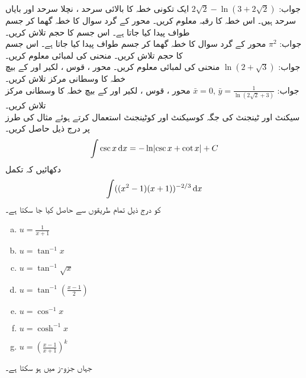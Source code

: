جواب:\quad
$2\sqrt{2}-\ln(3+2\sqrt{2})$
ایک تکونی خطہ کا بالائی سرحد ، نچلا سرحد  اور بایاں سرحد  ہیں۔ اس خطہ کا رقبہ معلوم کریں۔
محور  کے گرد سوال  کا خطہ گھما کر جسم طواف پیدا کیا جاتا ہے۔ اس جسم کا حجم تلاش کریں۔\\
جواب:\quad
$\pi^2$
محور  کے گرد سوال  کا خطہ گھما کر جسم طواف پیدا کیا جاتا ہے۔ اس جسم کا حجم تلاش کریں۔
منحنی  کی لمبائی معلوم کریں۔\\
جواب:\quad
$\ln(2+\sqrt{3})$
منحنی  کی لمبائی معلوم کریں۔
محور ، قوس ، لکیر  اور  کے بیچ خطہ کا وسطانی مرکز تلاش کریں۔\\
جواب:\quad
$\bar{x}=0,\,\bar{y}=\tfrac{1}{\ln(2\sqrt{2}+3)}$
محور ، قوس ، لکیر  اور  کے بیچ خطہ کا وسطانی مرکز تلاش کریں۔
\\
سیکنٹ اور ٹینجنٹ کی جگہ کوسیکنٹ اور کوٹینجنٹ استعمال کرتے ہوئے مثال  کی طرز پر درج ذیل حاصل کریں۔
\begin{align*}
\int\csc x\dif x=-\ln\abs{\csc x+\cot x}+C
\end{align*}
دکھائیں کہ تکمل
\begin{align*}
\int((x^2-1)(x+1))^{-2/3}\dif x
\end{align*}
کو درج ذیل تمام طریقوں سے حاصل کیا جا سکتا ہے۔
\begin{multicols}{3}
\begin{enumerate}[a.]
\item
$u=\tfrac{1}{x+1}$
\item
$u=\tan^{-1}x$
\item
$u=\tan^{-1}\sqrt{x}$
\item
$u=\tan^{-1}(\tfrac{x-1}{2})$
\item
$u=\cos^{-1}x$
\item
$u=\cosh^{-1}x$
\item
$u=(\tfrac{x-1}{x+1})^k$
\end{enumerate}
\end{multicols}
جہاں جزو-ز میں  ہو سکتا ہے۔

